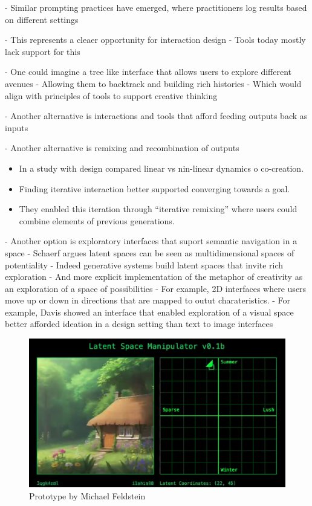 - Similar prompting practices have emerged, where practitioners log results based on different settings

- This represents a cleaer opportunity for interaction design
- Tools today mostly lack support for this

- One could imagine a tree like interface that allows users to explore different avenues
- Allowing them to backtrack and building rich histories
- Which would align with principles of tools to support creative thinking  \cite{Resnick2005-fs}

- Another alternative is interactions and tools that afford feeding outputs back as inputs

- Another alternative is remixing and recombination of outputs
\begin{itemize}
    \item In a study with design \cite{Zhou2024-vp} compared linear vs nin-linear dynamics o co-creation. 
    \item Finding iterative interaction better supported converging towards a goal. 
    \item They enabled this iteration through “iterative remixing” where users could combine elements of previous generations. 
\end{itemize}

- Another option is exploratory interfaces that suport semantic navigation in a space
- Schaerf \cite{Schaerf2024-gf} argues latent spaces can be seen as multidimensional spaces of potentiality
- Indeed generative systems build latent spaces that invite rich exploration
- And more explicit implementation of the metaphor of creativity as an exploration of a space of possibilities \cite{Boden2003-hk, Wiggins2019-yj}
- For example, 2D interfaces where users move up or down in directions that are mapped to outut charateristics. 
- For example, Davis showed an interface that enabled exploration of a visual space better afforded ideation in a design setting than text to image interfaces \cite{Davis2024-ml}

\begin{figure}
    \centering
    \includegraphics[width=1\linewidth]{latentspacemanip.png}
    \caption{Prototype by Michael Feldstein}
    \label{fig:enter-label}
\end{figure}


